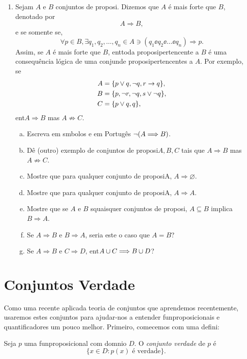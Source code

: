 \begin{enumerate}[{\bf 1.}]
\item Sejam $A$ e $B$ conjuntos de proposi\cois. Dizemos que $A$ \'e mais forte que $B$, denotado por
\[
A\Longrightarrow B,
\]
e se somente se,
\[
\forall p\in B,\exists q_1,q_2,\ldots,q_n \in A \ni (q_1\ee q_2\ee \ldots \ee q_n)\Rightarrow p.
\]
Assim, se $A$ \'e mais forte que $B$, ent\ao toda proposi\cao pertencente a $B$ \'e uma consequ\^encia l\'ogica de uma conjun\cao de proposi\coes pertencentes a $A$. Por exemplo, se
\begin{equation*}
 \begin{aligned}
A&=\{p\vee q, \lnot q, r\to q\},\\
B&=\{p, \lnot r, \lnot q, s\vee\lnot q\},\\
C&=\{p\vee q,q\},
 \end{aligned}
\end{equation*}
ent\ao $A\Longrightarrow B$ mas $A\not\Longrightarrow C$.
\begin{enumerate}[a)]
\item Escreva em s\ih mbolos e em Portug\^es $\lnot(A\Longrightarrow B)$.
\item D\^e (outro) exemplo de conjuntos de proposi\coes $A,B,C$ tais que $A\Longrightarrow B$ mas $A\not\Longrightarrow C$. 
\item Mostre que para qualquer conjunto de proposi\coes A, $A\Longrightarrow \varnothing$.
\item Mostre que para qualquer conjunto de proposi\coes A, $A\Longrightarrow A$.
\item Mostre que se $A$ e $B$ s\ao quaisquer conjuntos de proposi\cois, $A\subseteq B$ implica $B\Longrightarrow A$.
\item Se $A\Longrightarrow B$ e $B\Longrightarrow A$, seria este o caso que $A=B$?
\item Se $A \Longrightarrow B$ e $C\Longrightarrow D$, ent\ao $A\cup C\Longrightarrow B\cup D$?
\end{enumerate}
\end{enumerate}

\section{Conjuntos Verdade}\label{conjuntosverdade}

Como uma recente aplica\cao  da teoria de conjuntos que aprendemos recentemente, usaremos estes conjuntos para ajudar-nos a entender fun\coes proposicionais e quantificadores um pouco melhor. Primeiro, comecemos com uma defini\caoi:
\begin{definb}
Seja $p$ uma fun\cao proposicional com dom\ih nio $D$. O {\it conjunto verdade} de $p$ \'e
\[
\{x\in D: p(x) \text{ \'e verdade}\}.
\]
\end{definb}


